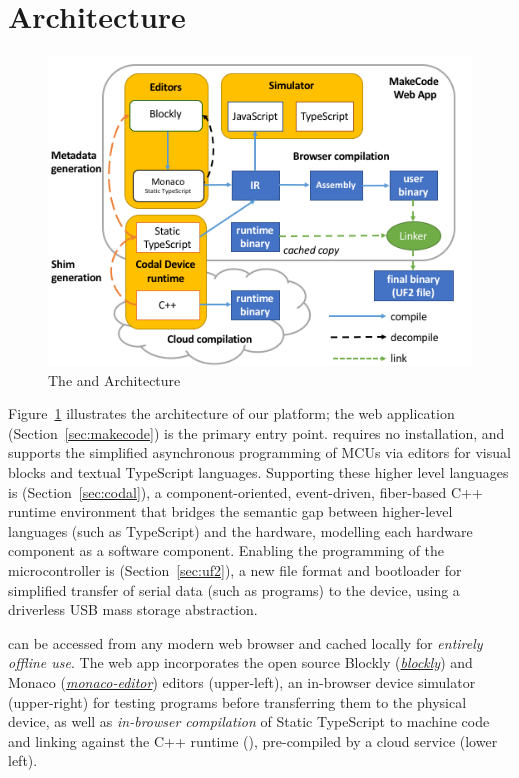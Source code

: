  \section{Architecture}

\begin{figure}[t]
    \includegraphics[width=\columnwidth]{images/arch-diagram.png}
    \setlength{\belowcaptionskip}{-10pt}
    \caption{\label{fig:makecode}The \MC and \CO Architecture}
\end{figure}

Figure~\ref{fig:makecode} illustrates the architecture of our platform; the \MC web application (Section~\ref{sec:makecode}) is the primary entry point. \MC requires no installation, and supports the simplified asynchronous programming of MCUs via editors for visual blocks and textual TypeScript languages. Supporting these higher level languages is \CO (Section~\ref{sec:codal}), a component-oriented, event-driven, fiber-based C++ runtime environment that bridges the semantic gap between higher-level languages (such as TypeScript) and the hardware, modelling each hardware component as a software component. Enabling the programming of the microcontroller is \UF (Section~\ref{sec:uf2}), a new file format and bootloader for simplified transfer of serial data (such as programs) to the device, using a driverless USB mass storage abstraction.

\MC can be accessed from any modern web browser and cached locally for \emph{entirely offline use}. The \MC web app incorporates the open source Blockly (\emph{\href{https://github.com/google/blockly}{blockly}}) and Monaco (\emph{\href{https://github.com/Microsoft/monaco-editor}{monaco-editor}}) editors (upper-left), an in-browser device simulator (upper-right) for testing programs before transferring them to the physical device, as well as \emph{in-browser compilation} of Static TypeScript to machine code and linking against the C++ runtime (\emph{\CON}), pre-compiled by a cloud service (lower left).

